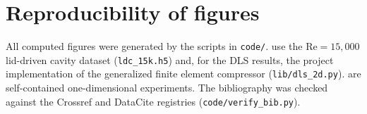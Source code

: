 \documentclass[11pt]{article}
\begin{document}
\section*{Reproducibility of figures}
All computed figures were generated by the scripts in \texttt{code/}.
 use the $\mathrm{Re}=15{,}000$
lid-driven cavity dataset (\texttt{ldc\_15k.h5}) and, for the DLS results, the
project implementation of the generalized finite element compressor
(\texttt{lib/dls\_2d.py}).
 are self-contained one-dimensional experiments.
The bibliography was checked against the Crossref and DataCite registries
(\texttt{code/verify\_bib.py}).

\printbibliography[heading=bibintoc,title={References}]
\end{document}
